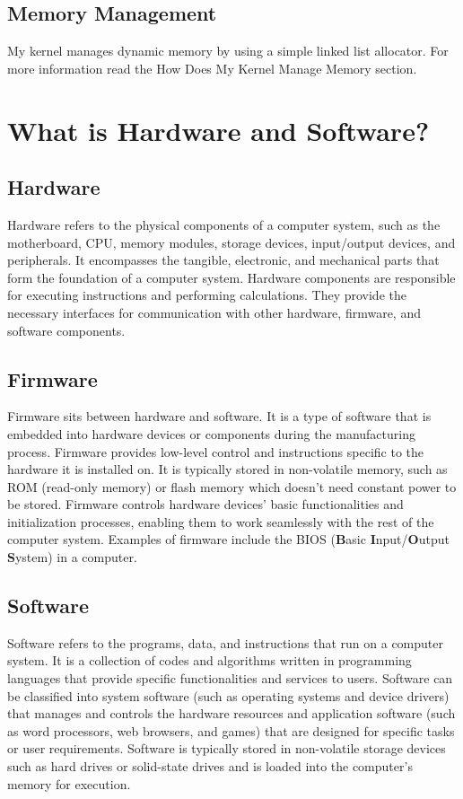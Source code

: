 \documentclass[12pt, letterpaper]{article}
\begin{document}
\subsection{Memory Management}

My kernel manages dynamic memory by using a simple linked list allocator. For more information read the How Does 
My Kernel Manage Memory section.

\section{What is Hardware and Software?}

\subsection{Hardware}
Hardware refers to the physical components of a computer system, such as the motherboard, CPU, memory modules, 
storage devices, input/output devices, and peripherals. It encompasses the tangible, electronic, and mechanical 
parts that form the foundation of a computer system. Hardware components are responsible for executing instructions 
and performing calculations. They provide the necessary interfaces for communication with other hardware, firmware, 
and software components.

\subsection{Firmware}
Firmware sits between hardware and software. It is a type of software that is embedded into hardware devices or 
components during the manufacturing process. Firmware provides low-level control and instructions specific to the 
hardware it is installed on. It is typically stored in non-volatile memory, such as ROM (read-only memory) or 
flash memory which doesn't need constant power to be stored. Firmware controls hardware devices' basic 
functionalities and initialization processes, enabling them to work seamlessly with the rest of the computer 
system. Examples of firmware include the BIOS (\textbf{B}asic \textbf{I}nput/\textbf{O}utput \textbf{S}ystem) in a computer.

\subsection{Software}
Software refers to the programs, data, and instructions that run on a computer system. It is a collection of 
codes and algorithms written in programming languages that provide specific functionalities and services to 
users. Software can be classified into system software (such as operating systems and device drivers) that 
manages and controls the hardware resources and application software (such as word processors, web browsers, 
and games) that are designed for specific tasks or user requirements. Software is typically stored in non-volatile 
storage devices such as hard drives or solid-state drives and is loaded into the computer's memory for execution.
\end{document}
